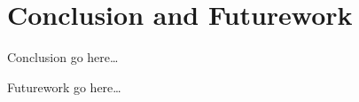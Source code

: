 \section{Conclusion and Futurework}
\label{sec:sec_conclusion}

Conclusion go here\ldots

Futurework go here\ldots
